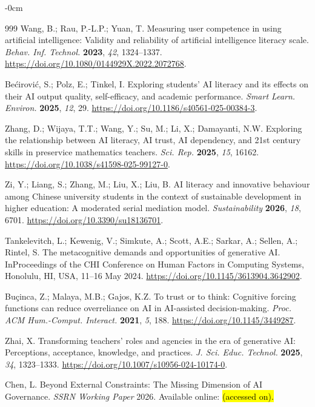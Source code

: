 \documentclass[sustainability,article,accept,moreauthors]{Definitions/mdpi}
\begin{document}
\begin{adjustwidth}{-\extralength}{0cm}
\begin{thebibliography}{999}
Wang, B.; Rau, P.-L.P.; Yuan, T. Measuring user competence in using artificial intelligence: Validity and reliability of artificial intelligence literacy scale. \textit{Behav. Inf. Technol.} \textbf{2023}, \textit{42}, 1324--1337. \url{https://doi.org/10.1080/0144929X.2022.2072768}.

Be{\'c}irovi{\'c}, S.; Polz, E.; Tinkel, I. Exploring students' AI literacy and its effects on their AI output quality, self-efficacy, and academic performance. \textit{Smart Learn. Environ.} \textbf{2025}, \textit{12}, 29. \url{https://doi.org/10.1186/s40561-025-00384-3}.

Zhang, D.; Wijaya, T.T.; Wang, Y.; Su, M.; Li, X.; Damayanti, N.W. Exploring the relationship between AI literacy, AI trust, AI dependency, and 21st century skills in preservice mathematics teachers. \textit{Sci. Rep.} \textbf{2025}, \textit{15}, 16162. \url{https://doi.org/10.1038/s41598-025-99127-0}.

Zi, Y.; Liang, S.; Zhang, M.; Liu, X.; Liu, B. AI literacy and innovative behaviour among Chinese university students in the context of sustainable development in higher education: A moderated serial mediation model. \textit{Sustainability} \textbf{2026}, \textit{18}, 6701. \url{https://doi.org/10.3390/su18136701}.

Tankelevitch, L.; Kewenig, V.; Simkute, A.; Scott, A.E.; Sarkar, A.; Sellen, A.; Rintel, S. The metacognitive demands and opportunities of generative AI. In{Proceedings of the CHI Conference on Human Factors in Computing Systems}, Honolulu, HI, USA, 11--16 May 2024. \url{https://doi.org/10.1145/3613904.3642902}.

Bu{\c{c}}inca, Z.; Malaya, M.B.; Gajos, K.Z. To trust or to think: Cognitive forcing functions can reduce overreliance on AI in AI-assisted decision-making. \textit{Proc. ACM Hum.-Comput. Interact.} \textbf{2021}, \textit{5}, 188. \url{https://doi.org/10.1145/3449287}.

Zhai, X. Transforming teachers' roles and agencies in the era of generative AI: Perceptions, acceptance, knowledge, and practices. \textit{J. Sci. Educ. Technol.} \textbf{2025}, \textit{34}, 1323--1333. \url{https://doi.org/10.1007/s10956-024-10174-0}.

Chen, L. Beyond External Constraints: The Missing Dimension of AI Governance. \textit{SSRN Working Paper} {2026}. Available online:  %
 \hl{(accessed on).} %



\end{thebibliography}
\end{adjustwidth}
\end{document}
